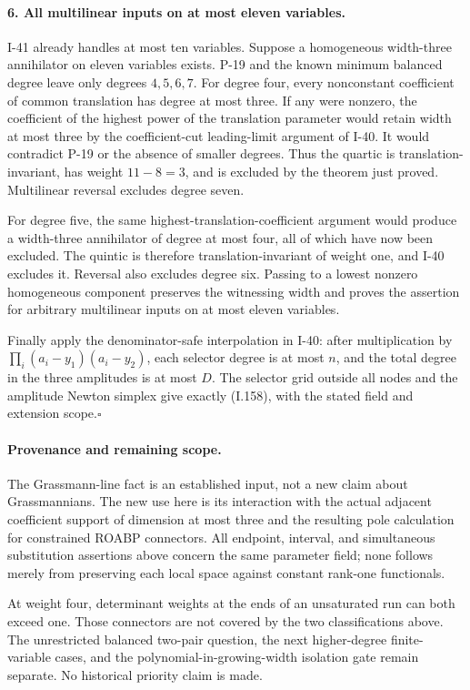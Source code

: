 \paragraph{6. All multilinear inputs on at most eleven variables.}
I-41 already handles at most ten variables. Suppose a
homogeneous width-three annihilator on eleven variables
exists. P-19 and the known minimum balanced degree leave
only degrees $4,5,6,7$. For degree four, every nonconstant
coefficient of common translation has degree at most three.
If any were nonzero, the coefficient of the highest power
of the translation parameter would retain width at most
three by the coefficient-cut leading-limit argument of I-40.
It would contradict P-19 or the absence of smaller degrees.
Thus the quartic is translation-invariant, has weight
$11-8=3$, and is excluded by the theorem just proved.
Multilinear reversal excludes degree seven.

For degree five, the same highest-translation-coefficient
argument would produce a width-three annihilator of degree
at most four, all of which have now been excluded. The
quintic is therefore translation-invariant of weight one,
and I-40 excludes it. Reversal also excludes degree six.
Passing to a lowest nonzero homogeneous component preserves
the witnessing width and proves the assertion for arbitrary
multilinear inputs on at most eleven variables.

Finally apply the denominator-safe interpolation in I-40:
after multiplication by
$\prod_i(a_i-y_1)(a_i-y_2)$, each selector degree is at most
$n$, and the total degree in the three amplitudes is at most
$D$. The selector grid outside all nodes and the amplitude
Newton simplex give exactly (I.158), with the stated field
and extension scope.\hfill$\square$

\paragraph{Provenance and remaining scope.}
The Grassmann-line fact is an established input, not a new
claim about Grassmannians. The new use here is its interaction
with the actual adjacent coefficient support of dimension at
most three and the resulting pole calculation for constrained
ROABP connectors. All endpoint, interval, and simultaneous
substitution assertions above concern the same parameter
field; none follows merely from preserving each local space
against constant rank-one functionals.

At weight four, determinant weights at the ends of an
unsaturated run can both exceed one. Those connectors are
not covered by the two classifications above. The unrestricted
balanced two-pair question, the next higher-degree finite-
variable cases, and the polynomial-in-growing-width isolation
gate remain separate. No historical priority claim is made.
